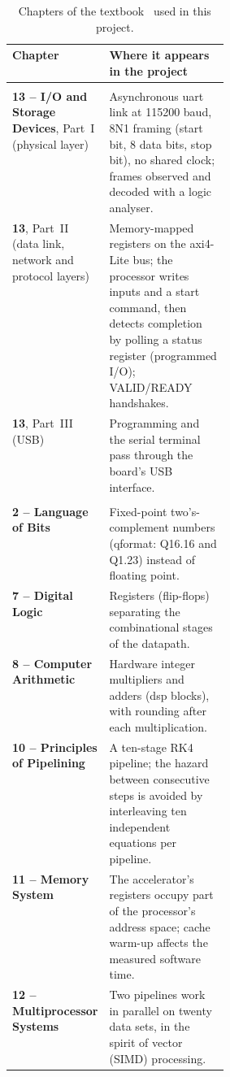 \begin{table}[H]
\centering
\caption{Chapters of the textbook~\cite{sarangi} used in this project.}
\label{tab:chapters}
\small
\begin{tabularx}{\linewidth}{@{}>{\raggedright\arraybackslash\hyphenpenalty=10000}p{0.31\linewidth}X@{}}
\toprule
\textbf{Chapter} & \textbf{Where it appears in the project} \\
\midrule
\multicolumn{2}{@{}l}{\textbf{Main basis}} \\
\textbf{13 -- I/O and Storage Devices}, Part~I (physical layer)
  & Asynchronous \gls{uart}\index{UART} link at 115200 baud, 8N1 framing (start bit, 8 data bits, stop bit), no shared clock; frames observed and decoded with a logic analyser. \\
\textbf{13}, Part~II (data link, network and protocol layers)
  & Memory-mapped registers on the \gls{axi}4-Lite\index{AXI4-Lite} bus; the processor writes inputs and a start command, then detects completion by \gls{polling}\index{polling} a status register (programmed I/O); VALID/READY handshakes. \\
\textbf{13}, Part~III (USB)
  & Programming and the serial terminal pass through the board's USB interface. \\
\midrule
\multicolumn{2}{@{}l}{\textbf{Supporting material}} \\
\textbf{2 -- Language of Bits}
  & Fixed-point two's-complement numbers (\gls{qformat}: Q16.16 and Q1.23) instead of floating point. \\
\textbf{7 -- Digital Logic}
  & Registers (flip-flops) separating the combinational stages of the datapath. \\
\textbf{8 -- Computer Arithmetic}
  & Hardware integer multipliers and adders (\gls{dsp} blocks), with rounding after each multiplication. \\
\textbf{10 -- Principles of Pipelining}
  & A ten-stage RK4 pipeline; the \gls{hazard} between consecutive steps is avoided by interleaving ten independent equations per pipeline. \\
\textbf{11 -- Memory System}
  & The accelerator's registers occupy part of the processor's address space; cache warm-up affects the measured software time. \\
\textbf{12 -- Multiprocessor Systems}
  & Two pipelines work in parallel on twenty data sets, in the spirit of vector (SIMD) processing. \\
\bottomrule
\end{tabularx}
\end{table}

